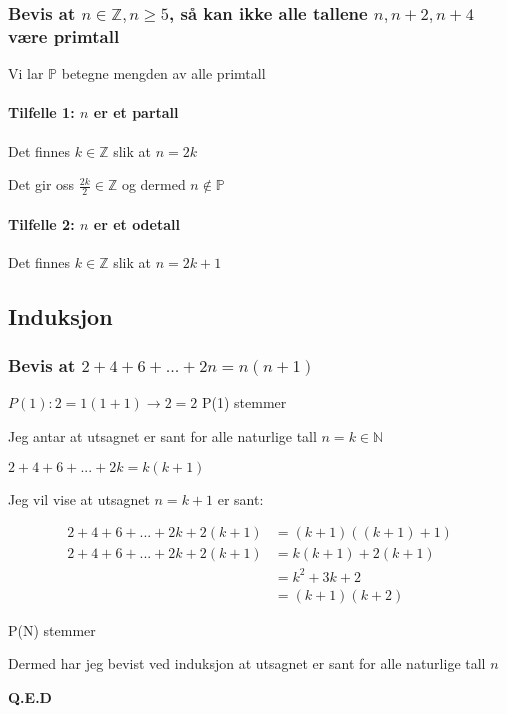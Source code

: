 \documentclass{article}
\begin{document}
\subsubsection{Bevis at $n \in \mathbb{Z}, n \geq 5$, så kan ikke alle tallene $n, n+2, n+4$ være primtall}

Vi lar $\mathbb{P}$ betegne mengden av alle primtall

\paragraph{Tilfelle 1: $n$ er et partall}

Det finnes $k \in \mathbb{Z}$ slik at $n=2k$

Det gir oss $\frac{2k}{2} \in \mathbb{Z}$ og dermed $n \notin \mathbb{P}$

\paragraph{Tilfelle 2: $n$ er et odetall}

Det finnes $k \in \mathbb{Z}$ slik at $n=2k+1$

\subsection{Induksjon}

\subsubsection{Bevis at $2+4+6+...+2n=n(n+1)$}

$P(1): 2=1(1+1) \rightarrow 2=2$ P(1) stemmer 

Jeg antar at utsagnet er sant for alle naturlige tall $n=k \in \mathbb{N}$

$2+4+6+...+2k=k(k+1)$

Jeg vil vise at utsagnet $n = k + 1$ er sant:

\begin{align*}
    2+4+6+...+2k+2(k+1) &= (k+1)((k+1) + 1) \\
    2+4+6+...+2k+2(k+1) &= k(k+1)+2(k+1) \\
    &= k^2+3k+2 \\
    &= (k+1)(k+2)
\end{align*}

P(N) stemmer

Dermed har jeg bevist ved induksjon at utsagnet er sant for alle naturlige tall $n$

\textbf{Q.E.D}
\end{document}
